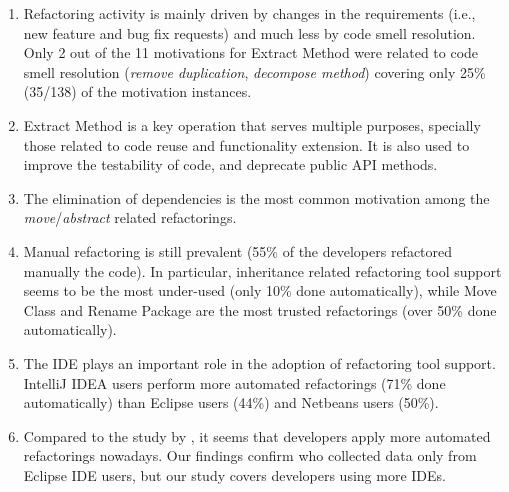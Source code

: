 \begin{enumerate}
	\item Refactoring activity is mainly driven by changes in the requirements (i.e., new feature and bug fix requests)
	and much less by code smell resolution.
	Only 2 out of the 11 motivations for {\textsc Extract Method} were related to code smell resolution (\emph{remove duplication}, \emph{decompose method}) covering only 25\% (35/138) of the motivation instances.
	\item {\textsc Extract Method} is a key operation that serves multiple purposes, specially those related to code
	reuse and functionality extension. It is also used to improve the testability of code, and deprecate public API methods.
	\item The elimination of dependencies is the most common motivation among the \emph{move}/\emph{abstract} related refactorings.
	\item Manual refactoring is still prevalent (55\% of the developers refactored manually the code).
	In particular, inheritance related refactoring tool support seems to be the most under-used (only 10\% done automatically),
	while {\textsc Move Class} and {\textsc Rename Package} are the most trusted refactorings (over 50\% done automatically).
	\item The IDE plays an important role in the adoption of refactoring tool support. IntelliJ IDEA users perform more automated refactorings (71\% done automatically) than Eclipse users (44\%) and Netbeans users (50\%).
	\item Compared to the study by \cite{MurphyHill2012}, it seems that developers apply more automated refactorings nowadays.
	Our findings confirm \cite{negara2013} who collected data only from Eclipse IDE users, but our study covers developers using more IDEs.
\end{enumerate}

